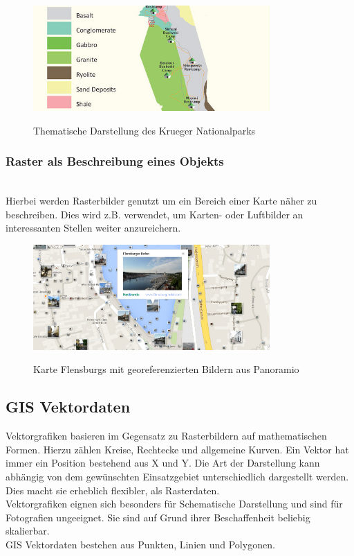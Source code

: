\documentclass[10pt,conference,compsocconf]{IEEEtran}
\begin{document}
\begin{figure}[H]
  \centering
  	\includegraphics[height=114pt]{img/gis_thematisch}\\
  \caption[]{Thematische Darstellung des Krueger Nationalparks\footnotemark}
  \label{img:gis_thematisch}
\end{figure}

\subsubsection{Raster als Beschreibung eines Objekts}\hspace*{\fill} \\
Hierbei werden Rasterbilder genutzt um ein Bereich einer Karte näher zu beschreiben. Dies wird z.B. verwendet, um Karten- oder Luftbilder an interessanten Stellen weiter anzureichern. 

\begin{figure}[H]
  \centering
  	\includegraphics[height=114pt]{img/gis_beschreibung_object}\\
  \caption[]{Karte Flensburgs mit georeferenzierten Bildern aus Panoramio\footnotemark}
  \label{img:gis_beschreibung_object}
\end{figure}

\subsection{GIS Vektordaten}
Vektorgrafiken basieren im Gegensatz zu Rasterbildern auf mathematischen Formen. Hierzu zählen Kreise, Rechtecke und allgemeine Kurven. Ein Vektor hat immer ein Position bestehend aus X und Y. Die Art der Darstellung kann abhängig von dem gewünschten Einsatzgebiet unterschiedlich dargestellt werden. Dies macht sie erheblich flexibler, als Rasterdaten.\\
Vektorgrafiken eignen sich besonders für Schematische Darstellung und sind für Fotografien ungeeignet. Sie sind auf Grund ihrer Beschaffenheit beliebig skalierbar.\\
GIS Vektordaten bestehen aus Punkten, Linien und Polygonen.\vspace{.5em}
\end{document}
